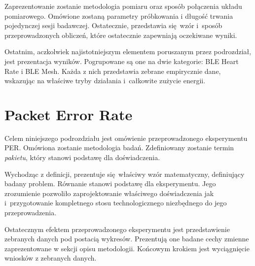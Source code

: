 Zaprezentowanie zostanie metodologia pomiaru oraz sposób połączenia
układu pomiarowego. Omówione zostaną parametry próbkowania i długość trwania
pojedynczej sesji badawczej. Ostatecznie, przedstawia się wzór i~sposób
przeprowadzonych obliczeń, które ostatecznie zapewniają oczekiwane wyniki.

Ostatnim, aczkolwiek najistotniejszym elementem poruszanym przez podrozdział,
jest prezentacja wyników. Pogrupowane są one na dwie kategorie: BLE Heart Rate
i BLE Mesh. Każda z nich przedstawia zebrane empirycznie dane, wskazując
na właściwe tryby działania i~całkowite zużycie energii.



\section{Packet Error Rate}\label{experiment:per}

Celem niniejszego podrozdziału jest omówienie przeprowadzonego eksperymentu \gls{PER}. Omówiona zostanie
metodologia badań. Zdefiniowany zostanie termin \textit{pakietu}, który stanowi podstawę dla
doświadczenia.

Wychodząc z definicji, prezentuje się właściwy wzór matematyczny, definiujący badany problem. Równanie
stanowi podstawę dla eksperymentu. Jego zrozumienie pozwoliło zaprojektowanie właściwego doświadczenia
jak i~przygotowanie kompletnego stosu technologicznego niezbędnego do jego przeprowadzenia.

Ostatecznym efektem przeprowadzonego eksperymentu jest przedstawienie zebranych danych pod postacią
wykresów. Prezentują one badane cechy zmienne zaprezentowane w sekcji opisu metodologii. Końcowym
krokiem jest wyciągnięcie wniosków z zebranych danych.
 

